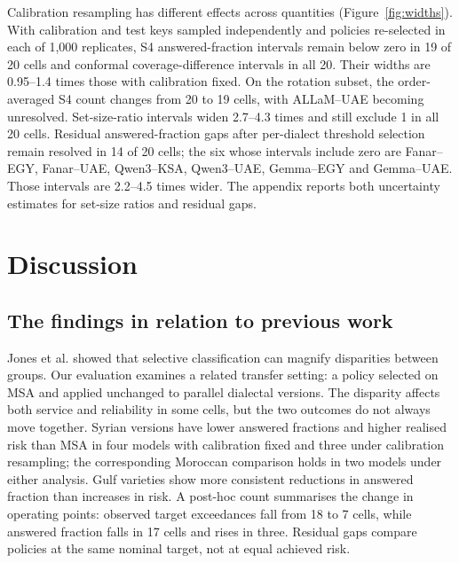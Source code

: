 \documentclass[applsci,article,submit,pdftex,oneauthor]{Definitions/mdpi}
\begin{document}
Calibration resampling has different effects across quantities (Figure~\ref{fig:widths}). With calibration and test keys sampled independently and policies re-selected in each of 1,000 replicates, S4 answered-fraction intervals remain below zero in 19 of 20 cells and conformal coverage-difference intervals in all 20. Their widths are 0.95--1.4 times those with calibration fixed. On the rotation subset, the order-averaged S4 count changes from 20 to 19 cells, with ALLaM--UAE becoming unresolved. Set-size-ratio intervals widen 2.7--4.3 times and still exclude 1 in all 20 cells. Residual answered-fraction gaps after per-dialect threshold selection remain resolved in 14 of 20 cells; the six whose intervals include zero are Fanar--EGY, Fanar--UAE, Qwen3--KSA, Qwen3--UAE, Gemma--EGY and Gemma--UAE. Those intervals are 2.2--4.5 times wider. The appendix reports both uncertainty estimates for set-size ratios and residual gaps.

\hypertarget{discussion}{%
\section{Discussion}\label{discussion}}

\hypertarget{the-findings-in-relation-to-previous-work}{%
\subsection{The findings in relation to previous work}\label{the-findings-in-relation-to-previous-work}}

Jones et al. \cite{jones2021selective} showed that selective classification can magnify disparities between groups. Our evaluation examines a related transfer setting: a policy selected on MSA and applied unchanged to parallel dialectal versions. The disparity affects both service and reliability in some cells, but the two outcomes do not always move together. Syrian versions have lower answered fractions and higher realised risk than MSA in four models with calibration fixed and three under calibration resampling; the corresponding Moroccan comparison holds in two models under either analysis. Gulf varieties show more consistent reductions in answered fraction than increases in risk. A post-hoc count summarises the change in operating points: observed target exceedances fall from 18 to 7 cells, while answered fraction falls in 17 cells and rises in three. Residual gaps compare policies at the same nominal target, not at equal achieved risk.
\end{document}
